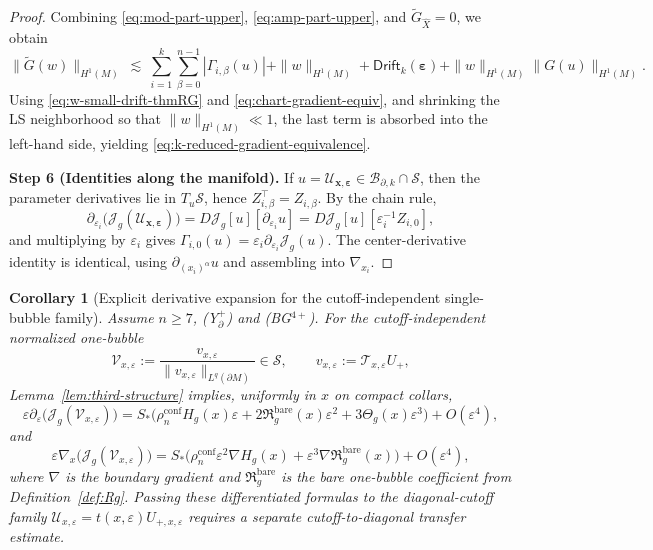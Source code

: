 \documentclass[11pt,reqno,a4paper]{amsart}
\numberwithin{equation}{section}
\theoremstyle{plain}
\newtheorem{corollary}[theorem]{Corollary}
\theoremstyle{remark}
\theoremstyle{plain}
\begin{document}
\begin{proof}
Combining \eqref{eq:mod-part-upper}, \eqref{eq:amp-part-upper}, and
$\widetilde G_{\widehat X}=0$, we obtain
\[
\|\widetilde G(w)\|_{H^1(M)}
\ \lesssim\ \sum_{i=1}^k\sum_{\beta=0}^{n-1}|\Gamma_{i,\beta}(u)|
+\|w\|_{H^1(M)}+\mathsf{Drift}_k(\boldsymbol\varepsilon)
+\|w\|_{H^1(M)}\|G(u)\|_{H^1(M)}.
\]
Using \eqref{eq:w-small-drift-thmRG} and \eqref{eq:chart-gradient-equiv}, and shrinking the LS neighborhood so that
$\|w\|_{H^1(M)}\ll1$, the last term is absorbed into the left-hand side, yielding
\eqref{eq:k-reduced-gradient-equivalence}.

\smallskip\noindent
\textbf{Step 6 (Identities along the manifold).}
If $u=\mathcal U_{\mathbf x,\boldsymbol\varepsilon}\in\mathcal B_{\partial,k}\cap\mathcal S$, then the parameter derivatives
lie in $T_u\mathcal S$, hence $Z_{i,\beta}^{\top}=Z_{i,\beta}$.
By the chain rule,
\[
\partial_{\varepsilon_i}\big(\mathcal J_g(\mathcal U_{\mathbf x,\boldsymbol\varepsilon})\big)
=D\mathcal J_g[u][\partial_{\varepsilon_i}u]
=D\mathcal J_g[u][\varepsilon_i^{-1}Z_{i,0}],
\]
and multiplying by $\varepsilon_i$ gives $\Gamma_{i,0}(u)=\varepsilon_i\partial_{\varepsilon_i}\mathcal J_g(u)$.
The center-derivative identity is identical, using $\partial_{(x_i)^\alpha}u$ and assembling into $\nabla_{x_i}$.
\end{proof}

\begin{corollary}[Explicit derivative expansion for the cutoff-independent single-bubble family]\label{cor:reduced-gradient-explicit}
Assume $n\ge7$, \textup{(Y$^+_{\partial}$)} and \textup{(BG$^{4+}$)}.
For the cutoff-independent normalized one-bubble
\[
\mathcal V_{x,\varepsilon}
:=\frac{v_{x,\varepsilon}}{\|v_{x,\varepsilon}\|_{L^q(\partial M)}}
\in\mathcal S,
\qquad
v_{x,\varepsilon}:=\mathcal T_{x,\varepsilon}U_+,
\]
Lemma~\ref{lem:third-structure} implies, uniformly in $x$ on compact collars,
\[
\varepsilon\partial_\varepsilon\big(\mathcal J_g(\mathcal V_{x,\varepsilon})\big)
= S_\ast\Big(\rho_n^{\mathrm{conf}}H_g(x)\varepsilon
+2\mathfrak R_g^{\mathrm{bare}}(x)\varepsilon^2
+3\Theta_g(x)\varepsilon^3\Big)+O(\varepsilon^4),
\]
and
\[
\varepsilon\nabla_x\big(\mathcal J_g(\mathcal V_{x,\varepsilon})\big)
= S_\ast\Big(\rho_n^{\mathrm{conf}}\varepsilon^2\nabla H_g(x)
+\varepsilon^3\nabla\mathfrak R_g^{\mathrm{bare}}(x)\Big)+O(\varepsilon^4),
\]
where $\nabla$ is the boundary gradient and $\mathfrak R_g^{\mathrm{bare}}$ is the bare one-bubble
coefficient from Definition~\ref{def:Rg}.
Passing these differentiated formulas to the diagonal-cutoff family
$\mathcal U_{x,\varepsilon}=t(x,\varepsilon)U_{+,x,\varepsilon}$ requires a separate
cutoff-to-diagonal transfer estimate.
\end{corollary}
\end{document}
